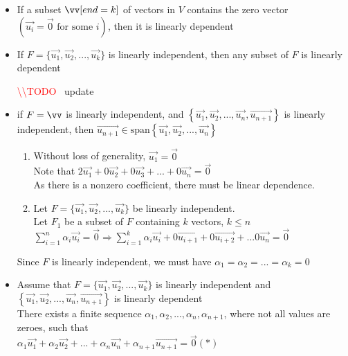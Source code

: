 \documentclass[12pt]{article}
\renewcommand{\v}[1]{\overrightarrow{#1}}
\newcommand{\vectorset}[1]{\{\v{#1_1}, \v{#1_2}, ..., \v{#1_k}\}}
\newenvironment{proof}{\block[Proof]}{\endblock}
\newcommand{\todo}[0]{\textcolor{red}{\textbackslash\textbackslash TODO \ }}
\newcommand{\bb}[1]{\left\{#1\right\}}
\newcommand{\pp}[1]{\left(#1\right)}
\newcommand{\sspan}[1]{\text{span}\bb{#1}}
\begin{document}
\begin{itemize}
	\item If a subset $\vv[end=k]$ of vectors in $V$ contains the zero vector $\pp{\v{u_i} = \v{0} \text{ for some } i}$, then it is linearly dependent
	
	\item If $F = \vectorset{u}$ is linearly independent, then any subset of $F$ is linearly dependent
	
	
	\todo update
	\item if $F = \vv$ is linearly independent, and $\bb{\v{u_1}, \v{u_2}, ..., \v{u_n}, \v{u_{n+1}}}$ is linearly independent, then $\v{u_{n+1}} \in \sspan{\v{u_1}, \v{u_2}, ..., \v{u_n}}$
	
	\begin{proof}
		\begin{enumerate}
			\item Without loss of generality, $\v{u_1} = \v{0}$ \\
			Note that $2 \v{u_1} + 0 \v{u_2} + 0 \v{u_3} + ... + 0 \v{u_n} = \v{0}$ \\
			As there is a nonzero coefficient, there must be linear dependence.
			
			\item Let $F = \vectorset{u}$ be linearly independent. \\
			Let $F_1$ be a subset of $F$ containing $k$ vectors, $k \le n$ \\
			$\sum_{i=1}^n \alpha_i \v{u_i} = \v{0} \Rightarrow \sum_{i=1}^k \alpha_i \v{u_i} + 0 \v{u_{i+1}} + 0 \v{u_{i+2}} + ... 0 \v{u_n} = \v{0}$
		\end{enumerate}
	\end{proof}

	Since $F$ is linearly independent, we must have $\alpha_1 = \alpha_2 = ... = \alpha_k = 0$

	\item Assume that $F = \vectorset{u}$ is linearly independent and $\bb{\v{u_1}, \v{u_2}, ..., \v{u_n}, \v{u_{n+1}}}$ is linearly dependent \\
	
	There exists a finite sequence $\alpha_1, \alpha_2, ..., \alpha_n, \alpha_{n+1}$, where not all values are zeroes, such that \\
	$\alpha_1 \v{u_1} + \alpha_2 \v{u_2} + ... + \alpha_n \v{u_n} + \alpha_{n+1} \v{u_{n+1}} = \v{0}(*)$ \\
	

\end{itemize}
\end{document}
